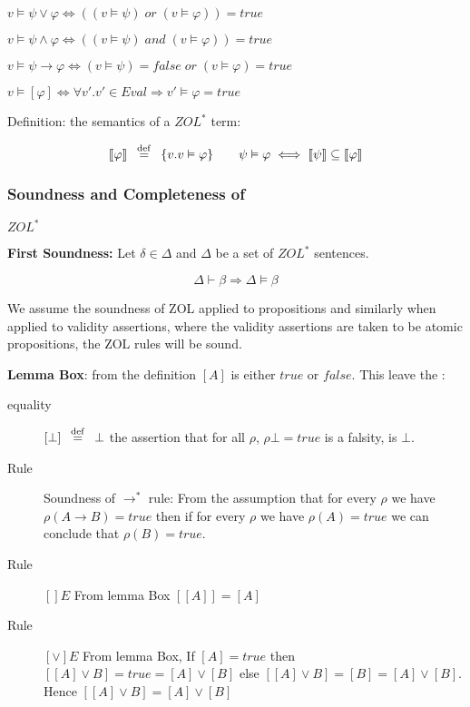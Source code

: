   $v\vDash \psi \vee \varphi \iff ((v \vDash \psi)\; or\; (v\vDash\varphi))= true$

  $v\vDash \psi \wedge \varphi \iff ((v \vDash \psi)\; and \;(v\vDash\varphi))= true$

$v\vDash \psi \rightarrow \varphi \iff (v \vDash \psi)= false \; or \;(v\vDash\varphi)= true$

   $v\vDash  [\varphi] \iff \forall v'. v'\in Eval\Rightarrow v' \vDash \varphi = true$
 
Definition: the semantics of a $ZOL^*$ term:

  \[\llbracket \varphi\rrbracket  \hspace*{0.5em} \stackrel{\mathrm{def}}{=} \hspace*{0.5em} \{v. v\vDash \varphi\}\qquad   \psi \vDash \varphi \iff \llbracket \psi\rrbracket \subseteq \llbracket \varphi\rrbracket\] 
 
 
\subsubsection{Soundness and Completeness of} {\bf $ZOL^*$}

{\bf First Soundness:}
Let $\delta\in \Delta$ and $\Delta$ be a set of $ZOL^*$ sentences.

\[ \Delta \vdash \beta  \Rightarrow \Delta \vDash \beta \]

We assume the soundness of ZOL applied to propositions and similarly when applied to validity assertions, where the validity assertions are taken to be atomic propositions, the ZOL rules will be sound. 

{\bf Lemma Box}: from the definition $[A]$ is either $true$ or $false$.
This leave the :

\begin{description}
\item [equality] $[\bot] \hspace*{0.5em} \stackrel{\mathrm{def}}{=} \hspace*{0.5em} \bot$ the assertion that for all $\rho$, $\rho\bot = true$ is a falsity, is $\bot$.
\item [Rule] Soundness of $\rightarrow^*$ rule:
From the assumption that for every $\rho$ we have $\rho(A\rightarrow B) = true$ then if for every $\rho$ we have $\rho(A) = true$ we can conclude that $\rho(B) = true$.
\item [Rule]  $[]E$  From lemma Box $[[A]] = [A]$
\item [Rule]   $[\vee]E$ From lemma Box, If  $[A]= true$ then $[[A]\vee B ] = true = [A]\vee [B]$ else $[[A]\vee B ] = [B] = [A]\vee [B]$. Hence $[[A]\vee B ] = [A]\vee [B]$
\end{description}


